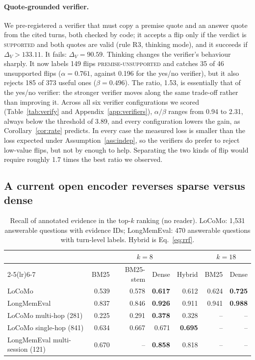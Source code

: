 \documentclass[10pt]{article}
\theoremstyle{plain}
\theoremstyle{definition}
\theoremstyle{remark}
\begin{document}
\paragraph{Quote-grounded verifier.}
We pre-registered a verifier that must copy a premise quote and an answer quote
from the cited turns, both checked by code; it accepts a flip only if the verdict
is \textsc{supported} and both quotes are valid (rule R3, thinking mode), and it
succeeds if $\Delta_V>133.11$. It fails: $\Delta_V=90.59$. Thinking changes the
verifier's behaviour sharply. It now labels 149 flips \textsc{premise-unsupported}
and catches 35 of 46 unsupported flips ($\alpha=0.761$, against 0.196 for the
yes/no verifier), but it also rejects 185 of 373 useful ones ($\beta=0.496$). The
ratio, 1.53, is essentially that of the yes/no verifier: the stronger verifier moves
along the same trade-off rather than improving it. Across all six verifier
configurations we scored (Table~\ref{tab:verify} and Appendix~\ref{app:verifiers}),
$\alpha/\beta$ ranges from 0.94 to 2.31, always below the threshold of 3.89, and
every configuration lowers the gain, as Corollary~\ref{cor:rate} predicts. In every
case the measured loss is smaller than the loss expected under
Assumption~\ref{ass:indep}, so the verifiers do prefer to reject low-value flips, but
not by enough to help. Separating the two kinds of flip would require roughly 1.7
times the best ratio we observed.

\subsection{A current open encoder reverses sparse versus dense}

\begin{table}[t]
\centering
\caption{Recall of annotated evidence in the top-$k$ ranking (no reader).
LoCoMo: 1,531 answerable questions with evidence IDs; LongMemEval: 470 answerable
questions with turn-level labels. Hybrid is Eq.~\eqref{eq:rrf}.}
\label{tab:retrieval}
\small
\begin{tabular}{lrrrrrr}
\toprule
 & \multicolumn{4}{c}{$k=8$} & \multicolumn{2}{c}{$k=18$} \\
\cmidrule(lr){2-5}\cmidrule(lr){6-7}
 & BM25 & BM25-stem & Dense & Hybrid & BM25 & Dense \\
\midrule
LoCoMo & 0.539 & 0.578 & \textbf{0.617} & 0.612 & 0.624 & \textbf{0.725} \\
LongMemEval & 0.837 & 0.846 & \textbf{0.926} & 0.911 & 0.941 & \textbf{0.988} \\
\midrule
LoCoMo multi-hop (281) & 0.225 & 0.291 & \textbf{0.378} & 0.328 & -- & -- \\
LoCoMo single-hop (841) & 0.634 & 0.667 & 0.671 & \textbf{0.695} & -- & -- \\
LongMemEval multi-session (121) & 0.670 & -- & \textbf{0.858} & 0.818 & -- & -- \\
\bottomrule
\end{tabular}
\end{table}
\end{document}

